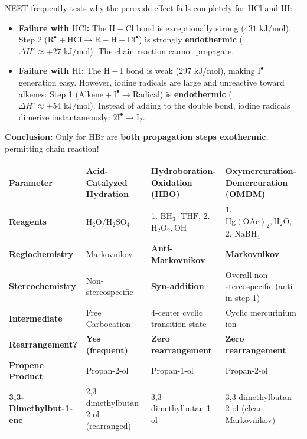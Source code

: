 \documentclass[10pt,twoside,openright]{book}
\begin{document}
\begin{trapbox}
NEET frequently tests why the peroxide effect fails completely for $\mathrm{HCl}$ and $\mathrm{HI}$:
\begin{itemize}
  \item \textbf{Failure with $\mathrm{HCl}$:} The $\mathrm{H-Cl}$ bond is exceptionally strong ($431\text{ kJ/mol}$). Step 2 ($\mathrm{R^\bullet + HCl \to R-H + Cl^\bullet}$) is strongly \textbf{endothermic} ($\Delta H^\circ \approx +27\text{ kJ/mol}$). The chain reaction cannot propagate.
  \item \textbf{Failure with $\mathrm{HI}$:} The $\mathrm{H-I}$ bond is weak ($297\text{ kJ/mol}$), making $\mathrm{I}^\bullet$ generation easy. However, iodine radicals are large and unreactive toward alkenes: Step 1 ($\mathrm{Alkene + I^\bullet \to Radical}$) is \textbf{endothermic} ($\Delta H^\circ \approx +54\text{ kJ/mol}$). Instead of adding to the double bond, iodine radicals dimerize instantaneously: $2\mathrm{I}^\bullet \to \mathrm{I_2}$.
\end{itemize}
\textbf{Conclusion:} Only for $\mathrm{HBr}$ are \textbf{both propagation steps exothermic}, permitting chain reaction!
\end{trapbox}

\begin{usecasebox}
{\footnotesize\setlength{\tabcolsep}{2.5pt}
\begin{tabularx}{\linewidth}{|l|Y|Y|Y|}
\hline
\textbf{Parameter} & \textbf{Acid-Catalyzed Hydration} & \textbf{Hydroboration-Oxidation (HBO)} & \textbf{Oxymercuration-Demercuration (OMDM)} \\
\hline
\textbf{Reagents} & $\mathrm{H_2O / H_2SO_4}$ & 1. $\mathrm{BH_3\cdot THF}$, 2. $\mathrm{H_2O_2, OH^-}$ & 1. $\mathrm{Hg(OAc)_2, H_2O}$, 2. $\mathrm{NaBH_4}$ \\
\hline
\textbf{Regiochemistry} & Markovnikov & \textbf{Anti-Markovnikov} & \textbf{Markovnikov} \\
\hline
\textbf{Stereochemistry} & Non-stereospecific & \textbf{Syn-addition} & Overall non-stereospecific (anti in step 1) \\
\hline
\textbf{Intermediate} & Free Carbocation & 4-center cyclic transition state & Cyclic mercurinium ion \\
\hline
\textbf{Rearrangement?} & \textbf{Yes (frequent)} & \textbf{Zero rearrangement} & \textbf{Zero rearrangement} \\
\hline
\textbf{Propene Product} & Propan-2-ol & Propan-1-ol & Propan-2-ol \\
\hline
\textbf{3,3-Dimethylbut-1-ene} & 2,3-dimethylbutan-2-ol (rearranged) & 3,3-dimethylbutan-1-ol & 3,3-dimethylbutan-2-ol (clean Markovnikov) \\
\hline
\end{tabularx}}
\end{usecasebox}
\end{document}
